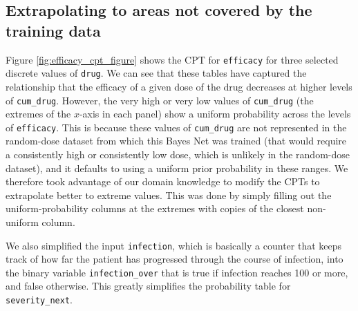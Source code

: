 \subsection{Extrapolating to areas not covered by the training data}



Figure \ref{fig:efficacy_cpt_figure} shows the CPT for \texttt{efficacy} for three selected discrete values of \texttt{drug}. We can see that these tables have captured the relationship that the efficacy of a given dose of the drug decreases at higher levels of \texttt{cum\_drug}. However, the very high or very low values of \texttt{cum\_drug} (the extremes of the $x$-axis in each panel) show a uniform probability across the levels of \texttt{efficacy}. This is because these values of \texttt{cum\_drug} are not represented in the random-dose dataset from which this Bayes Net was trained (that would require a consistently high or consistently low dose, which is unlikely in the random-dose dataset), and it defaults to using a uniform prior probability in these ranges. We therefore took advantage of our domain knowledge to modify the CPTs to extrapolate better to extreme values. This was done by simply filling out the uniform-probability columns at the extremes with copies of the closest non-uniform column.

We also simplified the input \texttt{infection}, which is basically a counter that keeps track of how far the patient has progressed through the course of infection, into the binary variable \texttt{infection\_over} that is true if infection reaches 100 or more, and false otherwise. 
This greatly simplifies the probability table for \texttt{severity\_next}.





